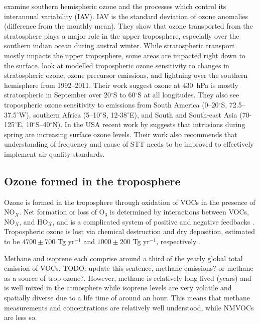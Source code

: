     \cite{Liu2017} examine southern hemispheric ozone and the processes which control its interannual variability (IAV).
    IAV is the standard deviation of ozone anomalies (difference from the monthly mean).
    They show that ozone transported from the stratosphere plays a major role in the upper troposphere, especially over the southern indian ocean during austral winter.
    While stratospheric transport mostly impacts the upper troposphere, some areas are impacted right down to the surface.
    \citet{Liu2017} look at modelled tropospheric ozone sensitivity to changes in stratospheric ozone, ozone precursor emissions, and lightning over the southern hemisphere from 1992--2011. 
    Their work suggest ozone at 430~hPa is mostly stratospheric in September over 20$^{\circ}$S to 60$^{\circ}$S at all longitudes.
    They also see tropospheric ozone sensitivity to emissions from South America (0--20$^{\circ}$S, 72.5--37.5$^{\circ}$W), southern Africa (5--10$^{\circ}$S, 12-38$^{\circ}$E), and South and South-east Asia (70-125$^{\circ}$E, 10$^{\circ}$S--40$^{\circ}$N).
    In the USA recent work by \cite{Lin2015} suggests that intrusions during spring are increasing surface ozone levels.
    Their work also recommends that understanding of frequency and cause of STT needs to be improved to effectively implement air quality standards.
    
  \subsection{Ozone formed in the troposphere}
    \label{LR:O3andAQ:BiogenicOzonePrecursors}
    
    Ozone is formed in the troposphere through oxidation of VOCs in the presence of NO$_X$.
    Net formation or loss of O$_3$ is determined by interactions between VOCs, NO$_X$, and HO$_X$, and is a complicated system of positive and negative feedbacks \citep{Atkinson2000}.
    Tropospheric ozone is lost via chemical destruction and dry deposition, estimated to be $4700\pm700$ Tg yr$^{-1}$ and $1000\pm200$ Tg yr$^{-1}$, respectively \citep{Stevenson2006}.
    
    Methane and isoprene each comprise around a third of the yearly global total emission of VOCs. TODO: update this sentence, methane emissions? or methane as a source of trop ozone?.
    However, methane is relatively long lived (years) and is well mixed in the atmosphere while isoprene levels are very volatile and spatially diverse due to a life time of around an hour.
    This means that methane measurements and concentrations are relatively well understood, while NMVOCs are less so.
    
